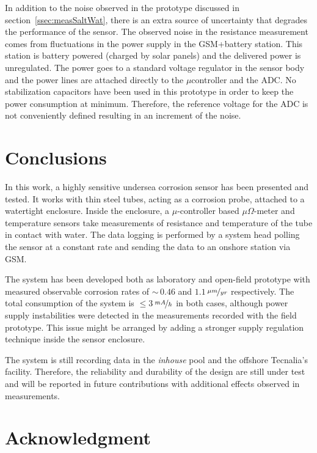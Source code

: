 \documentclass[journal,twoside,web]{ieeecolor}
\begin{document}
In addition to the noise observed in the prototype discussed in section~\ref{ssec:measSaltWat}, there is an extra source of uncertainty that degrades the performance of the sensor. The observed noise in the resistance measurement comes from fluctuations in the power supply in the GSM+battery station. This station is battery powered (charged by solar panels) and the delivered power is unregulated. The power goes to a standard voltage regulator in the sensor body and the power lines are attached directly to the $\mu$controller and the ADC. No stabilization capacitors have been used in this prototype in order to keep the power consumption at minimum. Therefore, the reference voltage for the ADC is not conveniently defined resulting in an increment of the noise.

\section{Conclusions}
\label{sec:conclusions}
In this work, a highly sensitive undersea corrosion sensor has been presented and tested. It works with thin steel tubes, acting as a corrosion probe, attached to a watertight enclosure. Inside the enclosure, a $\mu$-controller based $\mu\Omega$-meter and temperature sensors take measurements of resistance and temperature of the tube in contact with water. The data logging is performed by a system head polling the sensor at a constant rate and sending the data to an onshore station via GSM. 

The system has been developed both as laboratory and open-field prototype with measured observable corrosion rates of $\sim$\,$0.46$ and $1.1$\,$\nicefrac{\mu m}{yr}$ respectively. The total consumption of the system is $\leq 3$\,$\nicefrac{mA}{h}$ in both cases, although power supply instabilities were detected in the measurements recorded with the field prototype. This issue might be arranged by adding a stronger supply regulation technique inside the sensor enclosure.

The system is still recording data in the \textit{inhouse} pool and the offshore Tecnalia's facility. Therefore, the reliability and durability of the design are still under test and will be reported in future contributions with additional effects observed in measurements.



\section*{Acknowledgment}
\end{document}
